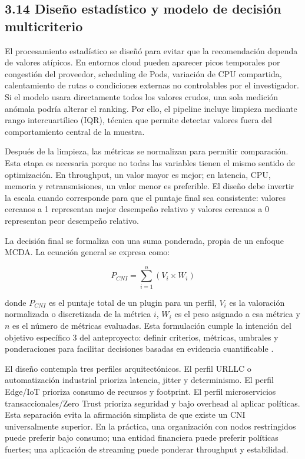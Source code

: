 \subsection{3.14 Diseño estadístico y modelo de decisión multicriterio}

El procesamiento estadístico se diseñó para evitar que la recomendación dependa de valores atípicos. En entornos cloud pueden aparecer picos temporales por congestión del proveedor, scheduling de Pods, variación de CPU compartida, calentamiento de rutas o condiciones externas no controlables por el investigador. Si el modelo usara directamente todos los valores crudos, una sola medición anómala podría alterar el ranking. Por ello, el pipeline incluye limpieza mediante rango intercuartílico (IQR), técnica que permite detectar valores fuera del comportamiento central de la muestra.

Después de la limpieza, las métricas se normalizan para permitir comparación. Esta etapa es necesaria porque no todas las variables tienen el mismo sentido de optimización. En throughput, un valor mayor es mejor; en latencia, CPU, memoria y retransmisiones, un valor menor es preferible. El diseño debe invertir la escala cuando corresponde para que el puntaje final sea consistente: valores cercanos a 1 representan mejor desempeño relativo y valores cercanos a 0 representan peor desempeño relativo.

La decisión final se formaliza con una suma ponderada, propia de un enfoque MCDA. La ecuación general se expresa como:

\[
P_{CNI}=\sum_{i=1}^{n}(V_i \times W_i)
\]

donde \(P_{CNI}\) es el puntaje total de un plugin para un perfil, \(V_i\) es la valoración normalizada o discretizada de la métrica \(i\), \(W_i\) es el peso asignado a esa métrica y \(n\) es el número de métricas evaluadas. Esta formulación cumple la intención del objetivo específico 3 del anteproyecto: definir criterios, métricas, umbrales y ponderaciones para facilitar decisiones basadas en evidencia cuantificable \cite{ref29}.

El diseño contempla tres perfiles arquitectónicos. El perfil URLLC o automatización industrial prioriza latencia, jitter y determinismo. El perfil Edge/IoT prioriza consumo de recursos y footprint. El perfil microservicios transaccionales/Zero Trust prioriza seguridad y bajo overhead al aplicar políticas. Esta separación evita la afirmación simplista de que existe un CNI universalmente superior. En la práctica, una organización con nodos restringidos puede preferir bajo consumo; una entidad financiera puede preferir políticas fuertes; una aplicación de streaming puede ponderar throughput y estabilidad.

